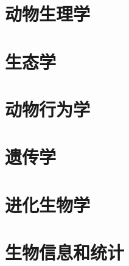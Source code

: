 \documentclass[b5paper,zihao=-4,titlepage]{ctexart}
\begin{document}
	\section{动物生理学}
	\section{生态学}
	\section{动物行为学}

	\section{遗传学}
	\section{进化生物学}
	\section{生物信息和统计}
\end{document}
